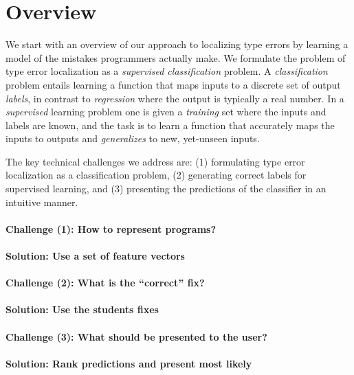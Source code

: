 \section{Overview}
\label{sec:overview}

We start with an overview of our approach to localizing type errors by
learning a model of the mistakes programmers actually make.
%
We formulate the problem of type error localization as a
\emph{supervised classification} problem.
%
A \emph{classification} problem entails learning a function that maps
inputs to a discrete set of output \emph{labels}, in contrast to
\emph{regression} where the output is typically a real number.
%
In a \emph{supervised} learning problem one is given a \emph{training}
set where the inputs and labels are known, and the task is to learn a
function that accurately maps the inputs to outputs and
\emph{generalizes} to new, yet-unseen inputs.

The key technical challenges we address are:
%
(1) formulating type error localization as a classification problem,
%
(2) generating correct labels for supervised learning, and
%
(3) presenting the predictions of the classifier in an intuitive manner.

\paragraph{\textbf{Challenge (1):} How to represent programs?}


\paragraph{\textbf{Solution:} Use a \textbf{set} of feature vectors}

\paragraph{\textbf{Challenge (2):} What is the ``correct'' fix?}

\paragraph{\textbf{Solution:} Use the students fixes}

\paragraph{\textbf{Challenge (3):} What should be presented to the user?}

\paragraph{\textbf{Solution:} Rank predictions and present most likely}




